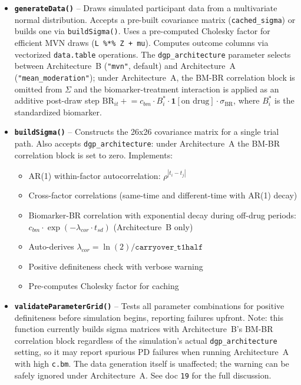 \documentclass[11pt]{article}
\begin{document}
\begin{itemize}
  \item \textbf{\texttt{generateData()}} -- Draws simulated
    participant data from a multivariate normal distribution.
    Accepts a pre-built covariance matrix
    (\texttt{cached\_sigma}) or builds one via
    \texttt{buildSigma()}. Uses a pre-computed Cholesky factor
    for efficient MVN draws (\texttt{L \%*\% Z + mu}). Computes
    outcome columns via vectorized \texttt{data.table}
    operations. The \texttt{dgp\_architecture} parameter
    selects between Architecture~B (\texttt{"mvn"}, default)
    and Architecture~A (\texttt{"mean\_moderation"}); under
    Architecture~A, the BM-BR correlation block is omitted
    from $\Sigma$ and the biomarker-treatment interaction is
    applied as an additive post-draw step
    $\text{BR}_{it} \mathrel{+}= c_{bm} \cdot B_i^{*} \cdot
    \mathbf{1}[\text{on drug}] \cdot \sigma_{\text{BR}}$,
    where $B_i^{*}$ is the standardized biomarker.

  \item \textbf{\texttt{buildSigma()}} -- Constructs the 26x26
    covariance matrix for a single trial path. Also accepts
    \texttt{dgp\_architecture}: under Architecture~A the BM-BR
    correlation block is set to zero. Implements:
    \begin{itemize}
      \item AR(1) within-factor autocorrelation: $\rho^{|t_i - t_j|}$
      \item Cross-factor correlations (same-time and different-time
        with AR(1) decay)
      \item Biomarker-BR correlation with exponential decay during
        off-drug periods: $c_{bm} \cdot \exp(-\lambda_{cor} \cdot t_{sd})$
        (Architecture~B only)
      \item Auto-derives $\lambda_{cor} = \ln(2) / \texttt{carryover\_t1half}$
      \item Positive definiteness check with verbose warning
      \item Pre-computes Cholesky factor for caching
    \end{itemize}

  \item \textbf{\texttt{validateParameterGrid()}} -- Tests all
    parameter combinations for positive definiteness before
    simulation begins, reporting failures upfront. Note: this
    function currently builds sigma matrices with Architecture~B's
    BM-BR correlation block regardless of the simulation's actual
    \texttt{dgp\_architecture} setting, so it may report spurious
    PD failures when running Architecture~A with high
    \texttt{c.bm}. The data generation itself is unaffected; the
    warning can be safely ignored under Architecture~A. See doc
    \texttt{19} for the full discussion.
\end{itemize}
\end{document}
